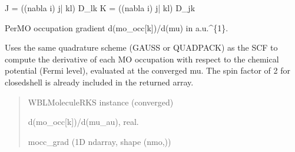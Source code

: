 \documentclass[letterpaper,10pt,english]{sphinxmanual}
\begin{document}
\begin{fulllineitems}
\begin{fulllineitems}
\label{\detokenize{fcdft.grad:fcdft.grad.rks.GradientsBase.get_k}}
\pysigstartsignatures
\pysiglinewithargsret
{}
{\sphinxparamcomma {}\sphinxparamcomma {}\sphinxparamcomma {}}
{}
\pysigstopsignatures
\end{fulllineitems}


\end{fulllineitems}


\begin{fulllineitems}
\label{\detokenize{fcdft.grad:fcdft.grad.rks.get_jk}}
\pysigstartsignatures
\pysiglinewithargsret
{}
{\sphinxparamcomma {}}
{}
\pysigstopsignatures
\sphinxAtStartPar
J = ((\sphinxhyphen{}nabla i) j| kl) D\_lk
K = ((\sphinxhyphen{}nabla i) j| kl) D\_jk

\end{fulllineitems}


\begin{fulllineitems}
\label{\detokenize{fcdft.grad:fcdft.grad.rks.get_mo_occ_grad}}
\pysigstartsignatures
\pysiglinewithargsret
{}
{}
{}
\pysigstopsignatures
\sphinxAtStartPar
Per\sphinxhyphen{}MO occupation gradient d(mo\_occ{[}k{]})/d(mu) in a.u.\textasciicircum{}\{\sphinxhyphen{}1\}.

\sphinxAtStartPar
Uses the same quadrature scheme (GAUSS or QUADPACK) as the SCF to compute
the derivative of each MO occupation with respect to the chemical potential
(Fermi level), evaluated at the converged mu.  The spin factor of 2 for
closed\sphinxhyphen{}shell is already included in the returned array.
\begin{quote}\begin{description}
\sphinxAtStartPar
{} \textendash{} WBLMoleculeRKS instance (converged)

\sphinxAtStartPar
d(mo\_occ{[}k{]})/d(mu\_au), real.

\sphinxAtStartPar
mocc\_grad (1D ndarray, shape (nmo,))

\end{description}\end{quote}

\end{fulllineitems}
\end{document}
